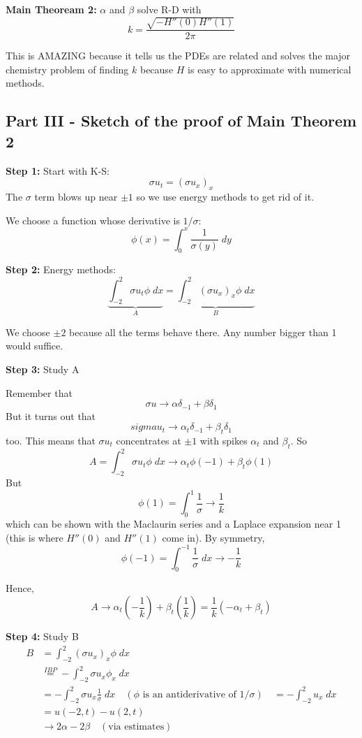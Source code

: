 \documentclass[12pt]{article}
\begin{document}
\textbf{Main Theoream 2:} $\alpha$ and $\beta$ solve R-D with 
\[\boxed{k = \frac{\sqrt{-H''(0)H''(1)}}{2\pi}}\]

This is AMAZING because it tells us the PDEs are related and solves the major chemistry problem of finding $k$ because $H$ is easy to approximate with numerical methods. 

\subsection*{Part III - Sketch of the proof of Main Theorem 2}
\textbf{Step 1:} Start with K-S:
\[\sigma u_t = (\sigma u_x)_x\]
The $\sigma$ term blows up near $\pm 1$ so we use energy methods to get rid of it. 

We choose a function whose derivative is $1/\sigma$:
\[\phi(x) = \int_0^x \frac{1}{\sigma(y)}\; dy\]

\textbf{Step 2:} Energy methods:
\[\underbrace{\int_{-2}^2 \sigma u_t \phi \; dx}_A = \underbrace{\int_{-2}^2 (\sigma u_x)_x \phi \; dx}_B\]

We choose $\pm 2$ because all the terms behave there. Any number bigger than 1 would suffice. 

\textbf{Step 3:} Study A 

Remember that \[\sigma u \to \alpha \delta_{-1} + \beta \delta_1\]
But it turns out that 
\[sigma u_t \to \alpha_t \delta_{-1} + \beta_t \delta_1\]
too. This means that $\sigma u_t$ concentrates at $\pm 1$ with spikes $\alpha_t$ and $\beta_t$. So 
\[A = \int_{-2}^2 \sigma u_t \phi \; dx \to \alpha_t \phi(-1) + \beta_t \phi(1)\]
But 
\[\phi(1) = \int_0^1 \frac{1}{\sigma} \to \frac{1}{k}\]
which can be shown with the Maclaurin series and a Laplace expansion near 1 (this is where $H''(0)$ and $H''(1)$ come in). By symmetry,
\[\phi(-1) = \int_0^{-1} \frac{1}{\sigma}\; dx \to -\frac{1}{k}\]

Hence, 
\[A \to \alpha_t \left(-\frac{1}{k}\right) + \beta_t \left(\frac{1}{k}\right) = \frac{1}{k}(-\alpha_t + \beta_t)\]

\textbf{Step 4:} Study B 
\begin{align*}
    B &= \int_{-2}^2 (\sigma u_x)_x \phi\; dx\\
    &\overset{IBP}{=} -\int_{-2}^2 \sigma u_x \phi_x\; dx\\
    &= -\int_{-2}^2 \sigma u_x \frac{1}{\sigma}\; dx \quad (\phi \text{ is an antiderivative of } 1/\sigma)\
    &= -\int_{-2}^2 u_x\; dx\\
    &= u(-2, t) - u(2, t)\\
    &\to 2\alpha - 2\beta\quad (\text{via estimates})
\end{align*}
\end{document}
